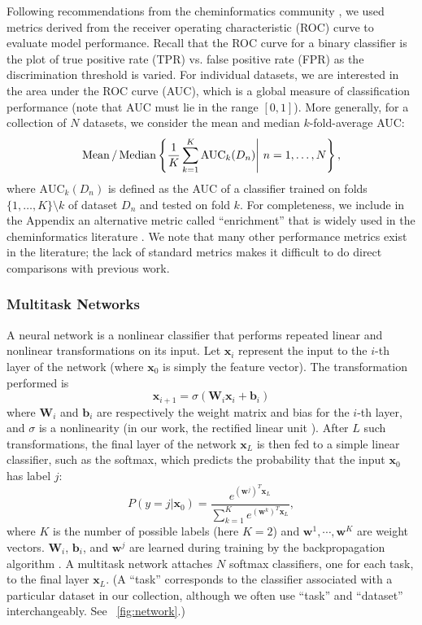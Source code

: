 Following recommendations from the cheminformatics community
\cite{jain2008recommendations}, we used metrics derived from the receiver
operating characteristic (ROC) curve to evaluate model performance. Recall
that the ROC curve for a binary classifier is the plot of true positive
rate (TPR) vs. false positive rate (FPR) as the discrimination threshold is
varied.  For individual datasets, we are interested in the area under the
ROC curve (AUC), which is a global measure of classification performance
(note that AUC must lie in the range $[0, 1]$).  More generally, for a
collection of $N$ datasets, we consider the mean and median
$k$-fold-average AUC:
\[
\operatorname*{Mean}/\operatorname*{Median}\left \{\frac{1}{K} \sum_{k=1}^K \text{AUC}_k(D_n)\middle | \ n=1,\dotsc,N\right \},
\]
where $\text{AUC}_k(D_n)$ is defined as the AUC of a classifier trained on
folds $\{1,\dotsc,K\} \setminus k$ of dataset $D_n$ and tested on fold $k$.
For completeness, we include in the Appendix an alternative metric called
``enrichment'' that is widely used in the cheminformatics literature
\cite{jain2008recommendations}. We note that many other performance metrics
exist in the literature; the lack of standard metrics makes it difficult to
do direct comparisons with previous work.

\subsubsection{Multitask Networks}

A neural network is a nonlinear classifier that performs repeated linear
and nonlinear transformations on its input. Let $\mathbf{x}_i$ represent
the input to the $i$-th layer of the network (where $\mathbf{x}_0$ is
simply the feature vector). The transformation performed is
\[
\mathbf{x}_{i+1} = \sigma(\mathbf{W}_{i} \mathbf{x}_i + \mathbf{b}_{i})
\]
where $\mathbf{W}_i$ and $\mathbf{b}_i$ are respectively the weight matrix
and bias for the $i$-th layer, and $\sigma$ is a nonlinearity (in our work,
the rectified linear unit \cite{nair2010rectified}). After $L$ such
transformations, the final layer of the network $\mathbf{x}_L$ is then fed
to a simple linear classifier, such as the softmax, which predicts the
probability that the input $\mathbf{x}_0$ has label $j$:
\[
P(y = j | \mathbf{x}_0 ) = \frac{e^{(\mathbf{w}^j)^T \mathbf{x}_L}}{\sum_{k=1}^K e^{(\mathbf{w}^k)^T \mathbf{x}_L}},
\]
where $K$ is the number of possible labels (here $K = 2$) and
$\mathbf{w}^{1}, \cdots, \mathbf{w}^{K}$ are weight vectors.
$\mathbf{W}_i$, $\mathbf{b}_i$, and $\mathbf{w}^j$ are learned during
training by the backpropagation algorithm \cite{rumelhart1988learning}.  A
multitask network attaches $N$ softmax classifiers, one for each task, to
the final layer $\mathbf{x}_L$. (A ``task'' corresponds to the classifier
associated with a particular dataset in our collection, although we often
use ``task'' and ``dataset'' interchangeably. See
\figurename~\ref{fig:network}.)

